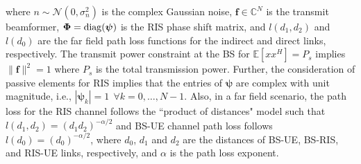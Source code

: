 \documentclass[journal,draftclsnofoot,onecolumn,12pt]{IEEEtran}
\begin{document}
where $n \sim \mathcal{N}(0,\sigma_n^2)$ is the complex Gaussian noise, $\mathbf{f}\in\mathbb{C}^N$ is the transmit beamformer, $\mathbf{\Phi}={\rm diag}(\boldsymbol{\psi})$ is the RIS phase shift matrix, and $l(d_1,d_2)$ and $l(d_0)$ are the far field path loss functions for the indirect and direct links, respectively. The transmit power constraint at the BS for $\mathbb{E}[xx^H] = P_s$ implies $\|\mathbf{f}\|^2 = 1$ where $P_s$ is the total transmission power. Further, the consideration of passive elements for RIS implies that the entries of $\boldsymbol{\psi}$ are complex with unit magnitude, i.e., $|\boldsymbol{\psi}_k| = 1 ~~ \forall k = 0,\ldots, N-1$. Also, in a far field scenario, the path loss for the RIS channel follows the ``product of distances" model such that $l(d_1,d_2) = (d_1d_2)^{-\alpha/2}$ \cite{LiuYuanwei_RISprinciples_2021} and BS-UE channel path loss follows $l(d_0) = (d_0)^{-\alpha/2}$, where $d_0$, $d_1$ and $d_2$ are the distances of BS-UE, BS-RIS, and RIS-UE links, respectively, and $\alpha$ is the path loss exponent.
\end{document}
